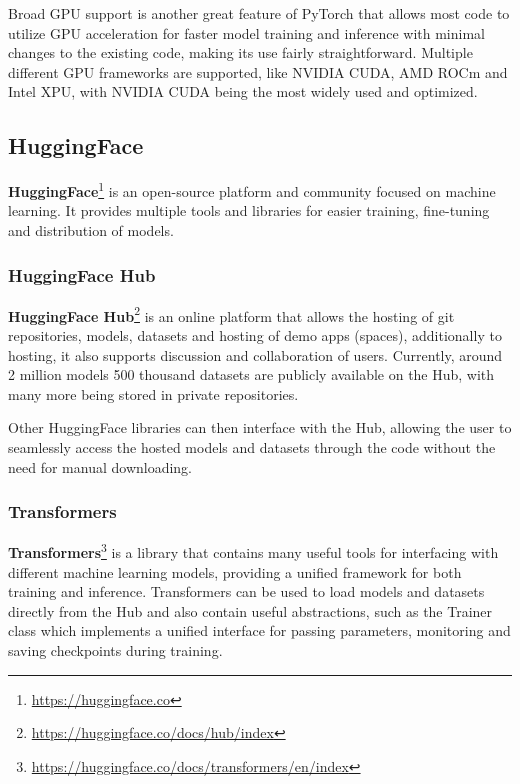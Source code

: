 Broad GPU support is another great feature of PyTorch that allows most code to utilize GPU acceleration for faster model training and inference with minimal changes to the existing code, making its use fairly straightforward.
Multiple different GPU frameworks are supported, like NVIDIA CUDA, AMD ROCm and Intel XPU, with NVIDIA CUDA being the most widely used and optimized.

\subsection{HuggingFace}

\textbf{HuggingFace}\footnote{\url{https://huggingface.co}} is an open-source platform and community focused on machine learning.
It provides multiple tools and libraries for easier training, fine-tuning and distribution of models.

\subsubsection{HuggingFace Hub}

\textbf{HuggingFace Hub}\footnote{\url{https://huggingface.co/docs/hub/index}} is an online platform that allows the hosting of git repositories, models, datasets and hosting of demo apps (spaces), additionally to hosting, it also supports discussion and collaboration of users.
Currently, around 2 million models 500 thousand datasets are publicly available on the Hub, with many more being stored in private repositories.

Other HuggingFace libraries can then interface with the Hub, allowing the user to seamlessly access the hosted models and datasets through the code without the need for manual downloading.

\subsubsection{Transformers}

\textbf{Transformers}\footnote{\url{https://huggingface.co/docs/transformers/en/index}} is a library that contains many useful tools for interfacing with different machine learning models, providing a unified framework for both training and inference.
Transformers can be used to load models and datasets directly from the Hub and also contain useful abstractions, such as the Trainer class which implements a unified interface for passing parameters, monitoring and saving checkpoints during training.

